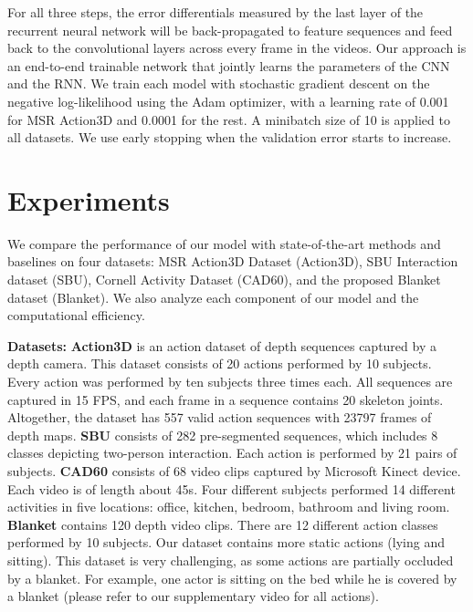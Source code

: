 \documentclass[10pt,twocolumn,letterpaper]{article}
\begin{document}
For all three steps, the error differentials measured by the last layer of the recurrent neural network will be back-propagated to feature sequences and feed back to the convolutional layers across every frame in the videos. Our approach is an end-to-end trainable network that jointly learns the parameters of the CNN and the RNN. We train each model with stochastic gradient descent on the negative log-likelihood using the Adam optimizer, with a learning rate of 0.001 for MSR Action3D and 0.0001 for the rest. A minibatch size of 10 is applied to all datasets. We use early stopping when the validation error starts to increase.



\section{Experiments}
We compare the performance of our model with state-of-the-art methods and baselines on four datasets: MSR Action3D Dataset \cite{Wanqing_cvprw_2010} (Action3D), SBU Interaction dataset \cite{kiwon_cvprw_2012} (SBU), Cornell Activity Dataset \cite{sung_rgbdactivity_2012}(CAD60), and the proposed Blanket dataset (Blanket). We also analyze each component of our model and the computational efficiency.


\noindent \textbf{Datasets:} \textbf{Action3D} is an action dataset of depth sequences captured by a depth camera.  This dataset consists of 20 actions performed by 10 subjects. Every action was performed by ten subjects three times each. All sequences are captured in 15 FPS, and each frame in a sequence contains 20 skeleton joints. Altogether, the dataset has 557 valid action sequences with 23797 frames of depth maps. \textbf{SBU} consists of 282 pre-segmented sequences, which includes 8 classes depicting two-person interaction. Each action is performed by 21 pairs of subjects. \textbf{CAD60} consists of 68 video clips captured by Microsoft Kinect device. Each video is of length about 45s. Four different subjects performed 14 different activities in five locations: office, kitchen, bedroom, bathroom and living room. \textbf{Blanket} contains 120 depth video clips. There are 12 different action classes performed by 10 subjects. Our dataset contains more static actions (\eg lying and sitting). This dataset is very challenging, as some actions are partially occluded by a blanket. For example, one actor is sitting on the bed while he is covered by a blanket (please refer to our supplementary video for all actions).
\end{document}
